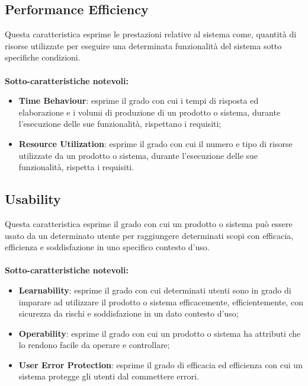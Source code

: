 \subsection{Performance Efficiency}
Questa caratteristica esprime le prestazioni relative al sistema come, quantità di risorse utilizzate per eseguire una determinata funzionalità del sistema sotto specifiche condizioni.  \\ \\
\textbf{Sotto-caratteristiche notevoli:}
\begin{itemize}
	\item{\textbf{Time Behaviour}}: esprime il grado con cui i tempi di risposta ed elaborazione e i volumi di produzione di un prodotto o sistema, durante l'esecuzione delle sue funzionalità, rispettano i requisiti;
	\item{\textbf{Resource Utilization}}: esprime il grado con cui il numero e tipo di risorse utilizzate da un prodotto o sistema, durante l'esecuzione delle sue funzionalità, rispetta i requisiti.
\end{itemize}

\subsection{Usability}
Questa caratteristica esprime il grado con cui un prodotto o sistema può essere usato da un determinato utente per raggiungere determinati scopi con efficacia, efficienza e soddisfazione in uno specifico contesto d'uso.\\ \\
\textbf{Sotto-caratteristiche notevoli:}
\begin{itemize}
	\item{\textbf{Learnability}}: esprime il grado con cui determinati utenti sono in grado di imparare ad utilizzare il prodotto o sistema efficacemente, efficientemente, con sicurezza da rischi e soddisfazione in un dato contesto d'uso;
	\item{\textbf{Operability}}: esprime il grado con cui un prodotto o sistema ha attributi che lo rendono facile da operare e controllare;
	\item{\textbf{User Error Protection}}: esprime il grado di efficacia ed efficienza con cui un sistema protegge gli utenti dal commettere errori.
\end{itemize}

